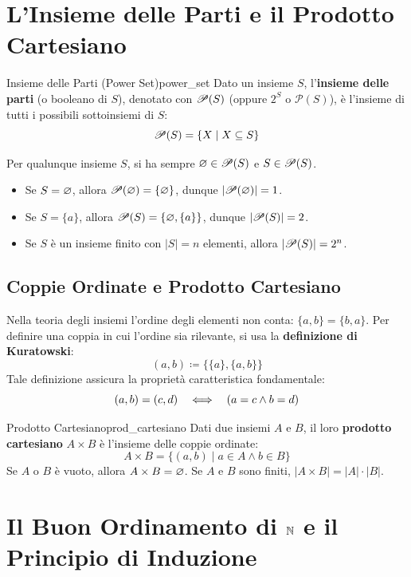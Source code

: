 \section{L'Insieme delle Parti e il Prodotto Cartesiano}

\begin{definizione}{Insieme delle Parti (Power Set)}{power_set}
Dato un insieme $S$, l'\textbf{insieme delle parti} (o booleano di $S$), denotato con $\P(S)$ (oppure $2^S$ o $\mathcal{P}(S)$), è l'insieme di tutti i possibili sottoinsiemi di $S$:
\[
    \P(S) = \{X \mid X \sseq S\}
\]
\end{definizione}

Per qualunque insieme $S$, si ha sempre $\vuoto \in \P(S)$ e $S \in \P(S)$.
\begin{itemize}
    \item Se $S = \vuoto$, allora $\P(\vuoto) = \{\vuoto\}$, dunque $|\P(\vuoto)| = 1$.
    \item Se $S = \{a\}$, allora $\P(S) = \{\vuoto, \{a\}\}$, dunque $|\P(S)| = 2$.
    \item Se $S$ è un insieme finito con $|S| = n$ elementi, allora $|\P(S)| = 2^n$.
\end{itemize}

\subsection{Coppie Ordinate e Prodotto Cartesiano}
Nella teoria degli insiemi l'ordine degli elementi non conta: $\{a, b\} = \{b, a\}$. Per definire una coppia in cui l'ordine sia rilevante, si usa la \textbf{definizione di Kuratowski}:
\[
    (a, b) \coloneqq \{\{a\}, \{a, b\}\}
\]
Tale definizione assicura la proprietà caratteristica fondamentale:
\[
    (a, b) = (c, d) \quad \Shiff \quad (a = c \wedge b = d)
\]

\begin{definizione}{Prodotto Cartesiano}{prod_cartesiano}
Dati due insiemi $A$ e $B$, il loro \textbf{prodotto cartesiano} $A \times B$ è l'insieme delle coppie ordinate:
\[
    A \times B = \{(a, b) \mid a \in A \wedge b \in B\}
\]
Se $A$ o $B$ è vuoto, allora $A \times B = \vuoto$. Se $A$ e $B$ sono finiti, $|A \times B| = |A| \cdot |B|$.
\end{definizione}

\section{Il Buon Ordinamento di $\N$ e il Principio di Induzione}

